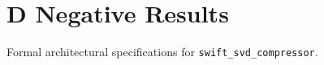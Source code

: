 \section{D Negative Results}

Formal architectural specifications for \texttt{swift_svd_compressor}.
